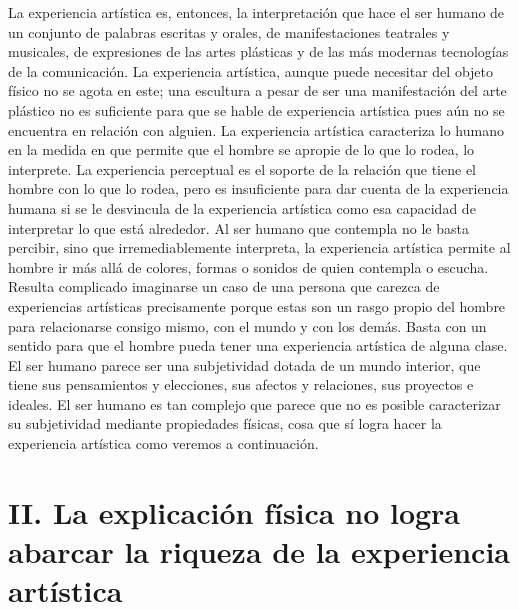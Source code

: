 \documentclass[]{book}
\begin{document}
\begin{refsection}
La experiencia artística es, entonces, la interpretación que hace el ser
humano de un conjunto de palabras escritas y orales, de manifestaciones
teatrales y musicales, de expresiones de las artes plásticas y de las
más modernas tecnologías de la comunicación. La experiencia artística,
aunque puede necesitar del objeto físico no se agota en este; una
escultura a pesar de ser una manifestación del arte plástico no es
suficiente para que se hable de experiencia artística pues aún no se
encuentra en relación con alguien. La experiencia artística caracteriza
lo humano en la medida en que permite que el hombre se apropie de lo que
lo rodea, lo interprete. La experiencia perceptual es el soporte de la
relación que tiene el hombre con lo que lo rodea, pero es insuficiente
para dar cuenta de la experiencia humana si se le desvincula de la
experiencia artística como esa capacidad de interpretar lo que está
alrededor. Al ser humano que contempla no le basta percibir, sino que
irremediablemente interpreta, la experiencia artística permite al hombre
ir más allá de colores, formas o sonidos de quien contempla o escucha.
Resulta complicado imaginarse un caso de una persona que carezca de
experiencias artísticas precisamente porque estas son un rasgo propio
del hombre para relacionarse consigo mismo, con el mundo y con los
demás. Basta con un sentido para que el hombre pueda tener una
experiencia artística de alguna clase. El ser humano parece ser una
subjetividad dotada de un mundo interior, que tiene sus pensamientos y
elecciones, sus afectos y relaciones, sus proyectos e ideales. El ser
humano es tan complejo que parece que no es posible caracterizar su
subjetividad mediante propiedades físicas, cosa que sí logra hacer la
experiencia artística como veremos a continuación.

\section*{II. La explicación física no logra abarcar la riqueza de la
  experiencia artística}



\end{refsection}
\end{document}
